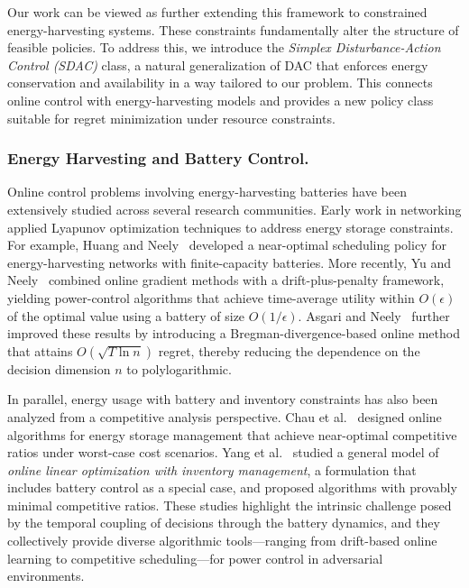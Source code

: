 Our work can be viewed as further extending this framework to constrained energy-harvesting systems. These constraints fundamentally alter the structure of feasible policies. To address this, we introduce the \emph{Simplex Disturbance-Action Control (SDAC)} class, a natural generalization of DAC that enforces energy conservation and availability in a way tailored to our problem. This connects online control with energy-harvesting models and provides a new policy class suitable for regret minimization under resource constraints.

\subsubsection{Energy Harvesting and Battery Control.}

Online control problems involving energy-harvesting batteries have been extensively studied across several research communities.  
Early work in networking applied Lyapunov optimization techniques to address energy storage constraints.  
For example, Huang and Neely~\cite{Huang2013} developed a near-optimal scheduling policy for energy-harvesting networks with finite-capacity batteries.  
More recently, Yu and Neely~\cite{Yu2019} combined online gradient methods with a drift-plus-penalty framework, yielding power-control algorithms that achieve time-average utility within $O(\epsilon)$ of the optimal value using a battery of size $O(1/\epsilon)$.  
Asgari and Neely~\cite{Asgari2020} further improved these results by introducing a Bregman-divergence-based online method that attains $O(\sqrt{T \ln n})$ regret, thereby reducing the dependence on the decision dimension $n$ to polylogarithmic.  

In parallel, energy usage with battery and inventory constraints has also been analyzed from a competitive analysis perspective.  
Chau et al.~\cite{Chau2016} designed online algorithms for energy storage management that achieve near-optimal competitive ratios under worst-case cost scenarios.  
Yang et al.~\cite{Yang2020} studied a general model of \emph{online linear optimization with inventory management}, a formulation that includes battery control as a special case, and proposed algorithms with provably minimal competitive ratios.  
These studies highlight the intrinsic challenge posed by the temporal coupling of decisions through the battery dynamics, and they collectively provide diverse algorithmic tools—ranging from drift-based online learning to competitive scheduling—for power control in adversarial environments.  

